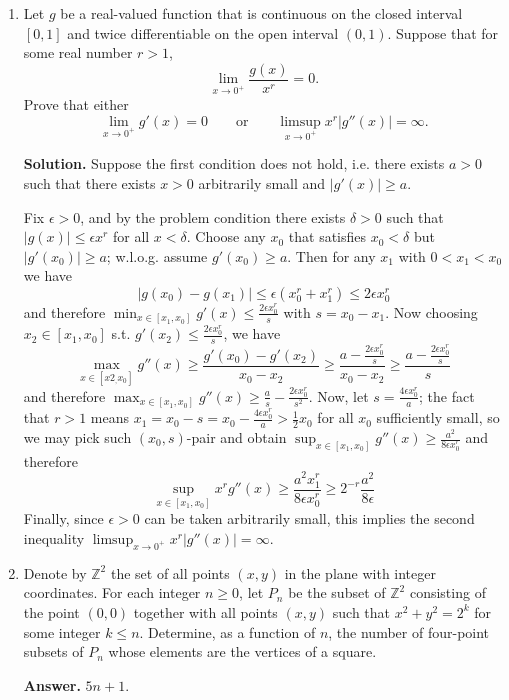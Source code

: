 \documentclass[11pt,a4paper]{article}
\newcommand{\<}{\langle}
\renewcommand{\>}{\rangle}
\begin{document}
\begin{enumerate}
	\item [\textbf{A6}] 
	Let $g$ be a real-valued function that is continuous on the closed interval $[0,1]$ and twice differentiable on the open interval $(0,1)$.  Suppose that for some real number $r>1$,
	\[
	\lim_{x\to 0^+}\frac{g(x)}{x^r} = 0.
	\]Prove that either
	\[
	\lim_{x\to 0^+}g'(x) = 0\qquad\text{or}\qquad \limsup_{x\to 0^+}x^r|g''(x)|= \infty.
	\]
	
	\textbf{Solution.} 
	Suppose the first condition does not hold, i.e. there exists $a > 0$ such that there exists $x>0$ arbitrarily small and $|g'(x)| \ge a$. 
	
	Fix $\epsilon > 0$, and by the problem condition there exists $\delta > 0$ such that $|g(x)|\le \epsilon x^r$ for all $x<\delta$. 
	Choose any $x_0$ that satisfies $x_0 < \delta$ but $|g'(x_0)|\ge a$; w.l.o.g. assume $g'(x_0)\ge a$. 
	Then for any $x_1$ with $0<x_1<x_0$ we have 
	\[
	|g(x_0)-g(x_1)|\le \epsilon(x_0^r+x_1^r)\le 2\epsilon x_0^r
	\]
	and therefore $\min_{x\in [x_1, x_0]}g'(x)\le \frac{2\epsilon x_0^r}{s}$ with $s=x_0-x_1$. 
	Now choosing $x_2\in [x_1, x_0]$ s.t. $g'(x_2)\le  \frac{2\epsilon x_0^r}{s}$, we have 
	\[\max_{x\in [x2_, x_0]}g''(x)\ge \frac{g'(x_0)-g'(x_2)}{x_0-x_2}\ge 
	\frac{a - \frac{2\epsilon x_0^r}{s}}{x_0-x_2}
	\ge \frac{a - \frac{2\epsilon x_0^r}{s}}{s}
	\]
	and therefore $\max_{x\in [x_1, x_0]} g''(x)\ge \frac{a}{s} - \frac{2\epsilon x_0^r}{s^2}$. 
	Now, let $s = \frac{4\epsilon x_0^r}{a}$; 
	the fact that $r > 1$ means $x_1 = x_0 - s = x_0 - \frac{4\epsilon x_0^r}{a} > \frac{1}{2}x_0$ for all $x_0$ sufficiently small, 
	so we may pick such $(x_0, s)$-pair and obtain 
	$
	\sup_{x\in [x_1, x_0]} g''(x)\ge \frac{a^2}{8\epsilon x_0^r}
	$
	and therefore 
	\[
	\sup_{x\in [x_1, x_0]} x^rg''(x) \ge \frac{a^2x_1^r}{8\epsilon x_0^r}\ge 2^{-r}\frac{a^2}{8\epsilon}
	\]
	Finally, since $\epsilon > 0$ can be taken arbitrarily small, this implies the second inequality 
	$\limsup_{x\to 0^+}x^r|g''(x)|= \infty$.
	
	\item [\textbf{B1}] Denote by $\mathbb Z^2$ the set of all points $(x,y)$ in the plane with integer coordinates.  For each integer $n\geq 0$, let $P_n$ be the subset of $\mathbb Z^2$ consisting of the point $(0,0)$ together with all points $(x,y)$ such that $x^2+y^2=2^k$ for some integer $k\leq n$.  Determine, as a function of $n$, the number of four-point subsets of $P_n$ whose elements are the vertices of a square.
	
	\textbf{Answer.} $5n + 1$. 
	

\end{enumerate}
\end{document}
